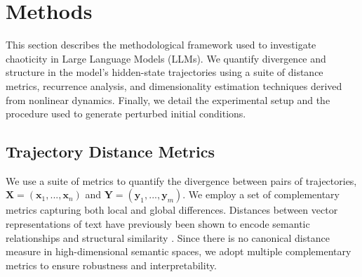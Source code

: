 \documentclass[a4paper,12pt]{article}
\begin{document}



\section{Methods}
\label{sec:methods}

This section describes the methodological framework used to investigate chaoticity in Large Language Models (LLMs). We quantify divergence and structure in the model's hidden-state trajectories using a suite of distance metrics, recurrence analysis, and dimensionality estimation techniques derived from nonlinear dynamics. Finally, we detail the experimental setup and the procedure used to generate perturbed initial conditions.

\subsection{Trajectory Distance Metrics}
\label{subsec:trajectory_distance_metrics}
We use a suite of metrics to quantify the divergence between pairs of trajectories, $\mathbf{X} = (\mathbf{x}_1, ..., \mathbf{x}_n)$ and $\mathbf{Y} = (\mathbf{y}_1, ..., \mathbf{y}_m)$. We employ a set of complementary metrics capturing both local and global differences. Distances between vector representations of text have previously been shown to encode semantic relationships and structural similarity \cite{text2vec, reimers2019sentencebertsentenceembeddingsusing}. Since there is no canonical distance measure in high-dimensional semantic spaces, we adopt multiple complementary metrics to ensure robustness and interpretability. 
\end{document}
